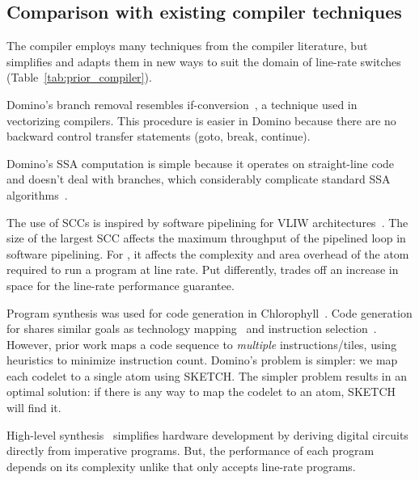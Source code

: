 \subsection{Comparison with existing compiler techniques}

The \pktlanguage compiler employs many techniques from the compiler literature,
but simplifies and adapts them in new ways to suit the domain of line-rate
switches (Table~\ref{tab:prior_compiler}).
\begin{CompactEnumerate}
  \item Domino's branch removal resembles if-conversion~\cite{if_conversion}, a
    technique used in vectorizing compilers. This procedure is easier in Domino
    because there are no backward control transfer statements (goto, break,
    continue).
  \item Domino's SSA computation is simple because it operates on
    straight-line code and doesn't deal with branches, which considerably
    complicate standard SSA algorithms~\cite{ssa}.
  \item The use of SCCs is inspired by software pipelining for VLIW
    architectures~\cite{software_pipelining}. The size of the largest SCC
    affects the maximum throughput of the pipelined loop in software
    pipelining. For \pktlanguage, it affects the complexity and area overhead
    of the atom required to run a program at line rate. Put differently,
    \pktlanguage trades off an increase in space for the line-rate performance
    guarantee.
  \item Program synthesis was used for code generation in
    Chlorophyll~\cite{chlorophyll}.  Code generation for \pktlanguage shares
    similar goals as technology mapping~\cite{micheli, flowmap, spectransform}
    and instruction selection~\cite{muchnik}.  However, prior work maps a code
    sequence to \textit{multiple} instructions/tiles, using heuristics to
    minimize instruction count. Domino's problem is simpler: we map each
    codelet to a single atom using SKETCH.  The simpler problem results in an
    optimal solution: if there is any way to map the codelet to an atom, SKETCH
    will find it.
  \item High-level synthesis~\cite{nurvadathi, cash, bluespec, vivado}
    simplifies hardware development by deriving digital circuits directly from
    imperative programs. But, the performance of each program depends on its
    complexity unlike \pktlanguage that only accepts line-rate programs.
\end{CompactEnumerate}
